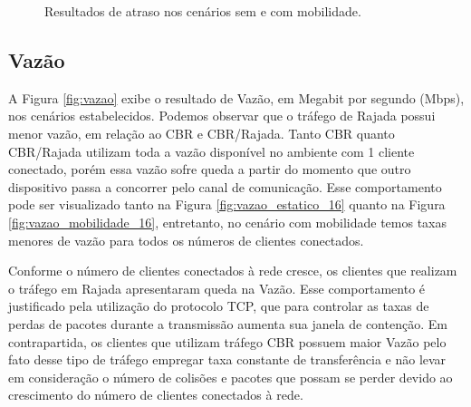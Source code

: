 \documentclass[12pt]{article}
\begin{document}
\begin{figure}[ht]
	\centering
	\caption{Resultados de atraso nos cenários sem e com mobilidade.}
	\label{fig:atraso}
\end{figure}

\subsection{Vazão}
\label{subsec:vazao_16}

A Figura \ref{fig:vazao} exibe o resultado de Vazão, em Megabit por segundo (Mbps), nos cenários estabelecidos. Podemos observar que o tráfego de Rajada possui menor vazão, em relação ao CBR e CBR/Rajada. Tanto CBR quanto CBR/Rajada utilizam toda a vazão disponível no ambiente com 1 cliente conectado, porém essa vazão sofre queda a partir do momento que outro dispositivo passa a concorrer pelo canal de comunicação. Esse comportamento pode ser visualizado tanto na Figura \ref{fig:vazao_estatico_16} quanto na Figura \ref{fig:vazao_mobilidade_16}, entretanto, no cenário com mobilidade temos taxas menores de vazão para todos os números de clientes conectados.

Conforme o número de clientes conectados à rede cresce, os clientes que realizam o tráfego em Rajada apresentaram queda na Vazão. Esse comportamento é justificado pela utilização do protocolo TCP, que para controlar as taxas de perdas de pacotes durante a transmissão aumenta sua janela de contenção. Em contrapartida, os clientes que utilizam tráfego CBR possuem maior Vazão pelo fato desse tipo de tráfego empregar taxa constante de transferência e não levar em consideração o número de colisões e pacotes que possam se perder devido ao crescimento do número de clientes conectados à rede.
\end{document}

